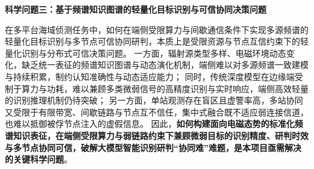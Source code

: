 \textbf{科学问题三：基于频谱知识图谱的轻量化目标识别与可信协同决策问题}

在多平台海域侦测任务中，如何在端侧受限算力与间歇通信条件下实现多源频谱的轻量化目标识别与多节点可信协同研判，本质上是受限资源与节点互信约束下的轻量化识别与分布式可信决策问题。
一方面，辐射源类型多样、电磁环境动态变化，缺乏统一表征的频谱知识图谱与动态演化机制，端侧难以对多源频谱一致建模与持续积累，制约认知准确性与动态适应能力；
同时，传统深度模型在边缘端受制于算力与功耗，难以兼顾多类微弱信号的高精度识别与实时响应，端侧高效轻量的识别推理机制仍待突破；
另一方面，单站观测存在盲区且虚警率高，多站协同又受限于有限带宽、间歇链路与节点互不信任，集中式融合既不适应弱连接信道，也难以抵御被俘节点注入的虚假信息。
因此，\textbf{如何构建面向电磁态势的标准化频谱知识表征，在端侧受限算力与弱链路约束下兼顾微弱目标的识别精度、研判时效与多节点协同可信，破解大模型智能识别研判“协同难”难题，是本项目亟需解决的关键科学问题}。